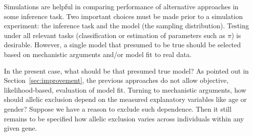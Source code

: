 \documentclass[letterpaper]{article}
\begin{document}
Simulations are helpful in comparing performance of alternative approaches in
some inference task.  Two important choices must be made prior to a
simulation experiment: the inference task and the model (the sampling
distribution).  Testing under all relevant tasks (classification or estimation of parameters
such as \(\pi\)) is desirable.  However, a single model that presumed to be true should be selected based on mechanistic arguments and/or model fit to
real data.

In the present case, what should be that presumed true model?  As pointed out
in Section~\ref{sec:improvement}, the previous approaches do not allow
objective, likelihood-based, evaluation of model fit.  Turning to mechanistic
arguments, how should allelic exclusion depend on the measured explanatory
variables like age or gender?  Suppose we have a reason to exclude such
dependence.  Then it still remains to be specified how allelic exclusion
varies across individuals within any given gene.
\end{document}
